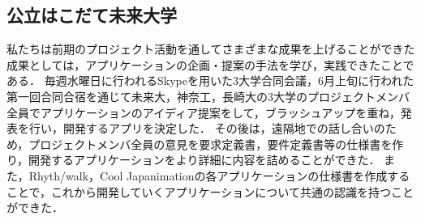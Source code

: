 \subsection{公立はこだて未来大学}
\par
私たちは前期のプロジェクト活動を通してさまざまな成果を上げることができた成果としては，アプリケーションの企画・提案の手法を学び，実践できたことである．
毎週水曜日に行われるSkypeを用いた3大学合同会議，6月上旬に行われた第一回合同合宿を通じて未来大，神奈工，長崎大の3大学のプロジェクトメンバ全員でアプリケーションのアイディア提案をして，ブラッシュアップを重ね，発表を行い，開発するアプリを決定した．
その後は，遠隔地での話し合いのため，プロジェクトメンバ全員の意見を要求定義書，要件定義書等の仕様書を作り，開発するアプリケーションをより詳細に内容を詰めることができた．
また，Rhyth/walk，Cool Japanimationの各アプリケーションの仕様書を作成することで，これから開発していくアプリケーションについて共通の認識を持つことができた．
